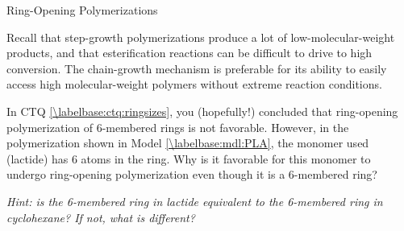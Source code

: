 \begin{activity}{Ring-Opening Polymerizations}
\begin{ctqs}
\begin{enumerate}
				\begin{solution}[1.5in]
					Recall that step-growth polymerizations produce a lot of low-molecular-weight products, and that esterification reactions can be difficult to drive to high conversion.  The chain-growth mechanism is preferable for its ability to easily access high molecular-weight polymers without extreme reaction conditions.
				\end{solution}
		\end{enumerate}
	
\end{ctqs}




\begin{exercises}

	\exercise In CTQ \ref{\labelbase:ctq:ringsizes}, you (hopefully!) concluded that ring-opening polymerization of 6-membered rings is not favorable.  However, in the polymerization shown in Model \ref{\labelbase:mdl:PLA}, the monomer used (lactide) has 6 atoms in the ring.  Why is it favorable for this monomer to undergo ring-opening polymerization even though it is a 6-membered ring?
	
		\emph{Hint: is the 6-membered ring in lactide equivalent to the 6-membered ring in cyclohexane?  If not, what is different?}
	
		\begin{solution}\end{solution}
	
\end{exercises}


%
%	


	
\end{activity}